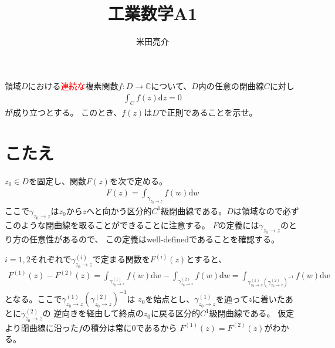 \documentclass{jsarticle}
\def\diff{\textrm{d}}
\newcommand{\red}[1]{\textcolor{red}{#1}}
\begin{document}
\title{工業数学A1}
\author{米田亮介}
\maketitle	

\section*{}
領域$D$における\red{連続な}複素関数$f:D\to\mathbb{C}$について、$D$内の任意の閉曲線$C$に対し
\begin{align*}
    \int_{C}f(z)\diff z=0
\end{align*}
が成り立つとする。
このとき、$f(z)$は$D$で正則であることを示せ。

\section*{こたえ}
$z_{0}\in D$を固定し、関数$F(z)$を次で定める。
\begin{align*}
    F(z)=\int_{\gamma_{z_{0}\to z}}f(w)\diff w
\end{align*}
ここで$\gamma_{z_{0}\to z}$は$z_{0}$から$z$へと向かう区分的$C^{1}$級閉曲線である。$D$は領域なので必ずこのような閉曲線を取ることができることに注意する。
$F$の定義には$\gamma_{z_{0}\to z}$のとり方の任意性があるので、
この定義はwell-definedであることを確認する。

$i=1,2$それぞれで$\gamma^{(i)}_{z_{0}\to z}$で定まる関数を$F^{(i)}(z)$とすると、
\begin{align*}
    F^{(1)}(z)-F^{(2)}(z)=\int_{\gamma^{(1)}_{z_{0}\to z}}f(w)\diff w-\int_{\gamma^{(2)}_{z_{0}\to z}}f(w)\diff w=\int_{\gamma^{(1)}_{z_{0}\to z}(\gamma^{(2)}_{z_{0}\to z})^{-1}}f(w)\diff w
\end{align*}
となる。ここで$\gamma^{(1)}_{z_{0}\to z}(\gamma^{(2)}_{z_{0}\to z})^{-1}$は
$z_{0}$を始点とし、$\gamma^{(1)}_{z_{0}\to z}$を通って$z$に着いたあとに$\gamma^{(2)}_{z_{0}\to z}$の
逆向きを経由して終点の$z_{0}$に戻る区分的$C^{1}$級閉曲線である。
仮定より閉曲線に沿った$f$の積分は常に$0$であるから
$F^{(1)}(z)=F^{(2)}(z)$がわかる。
\end{document}
